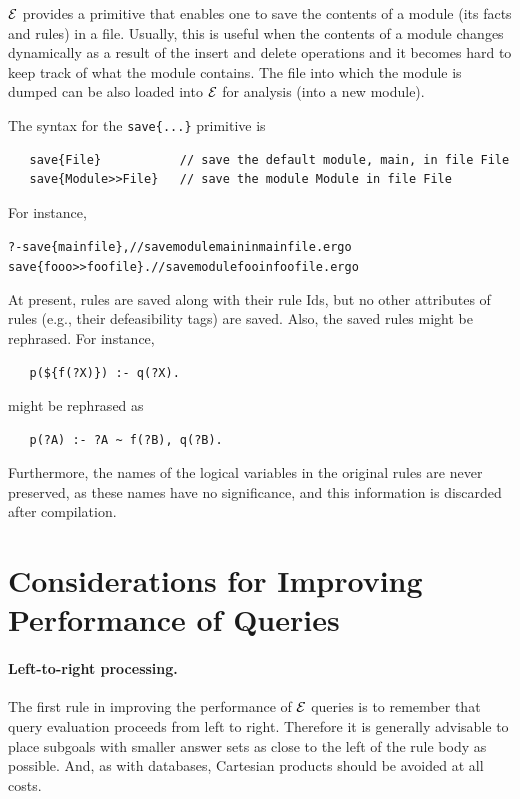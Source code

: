 \documentclass[11pt]{article}
\newcommand{\ERGO}{\mbox{\ensuremath{\cal{E}}\smaller{{\sc{RGO}}}}\xspace}
\newcommand{\FLSYSTEM}{\ERGO}
\newcommand{\ergoext}{ergo\xspace}
\begin{document}
\FLSYSTEM provides a primitive that enables one to save the contents of a
module (its facts and rules) in a file. Usually, this is useful when the
contents of a module changes dynamically as a result of the insert and
delete operations and it becomes hard to keep track of what the module
contains.  The file into which the module is dumped can be also loaded into
\FLSYSTEM for analysis (into a new module).

The syntax for the \texttt{save\{...\}}  primitive is 
\begin{verbatim}
   save{File}           // save the default module, main, in file File
   save{Module>>File}   // save the module Module in file File
\end{verbatim}
For instance,
\begin{alltt}
    ?- save\{mainfile\},     // save module main in mainfile.\ergoext
       save\{fooo>>foofile\}. // save module foo in foofile.\ergoext
\end{alltt}

At present, rules are saved along with their rule Ids, but no other
attributes of rules (e.g., their defeasibility tags)
are saved. Also, the saved rules might be rephrased. For instance,
\begin{verbatim}
   p(${f(?X)}) :- q(?X).
\end{verbatim}
might be rephrased as
\begin{verbatim}
   p(?A) :- ?A ~ f(?B), q(?B).
\end{verbatim}
Furthermore, the names of the logical variables in the original rules are never
preserved, as these names have no significance, and
this information is discarded after compilation.



\section{Considerations for Improving Performance of Queries}

\paragraph{Left-to-right processing.}
The first rule in improving the performance of \FLSYSTEM queries is to
remember that query evaluation proceeds from left to right. Therefore it is
generally advisable to place subgoals with smaller answer sets as close to
the left of the rule body as possible. And, as with databases, Cartesian
products should be avoided at all costs.
\end{document}
